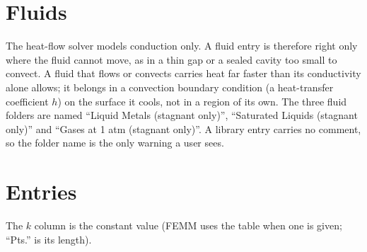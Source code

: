 \documentclass[10pt]{article}
\begin{document}
\section*{Fluids}

The heat-flow solver models conduction only. A fluid entry is therefore right only where the fluid cannot move, as in a thin gap or a sealed cavity too small to convect. A fluid that flows or convects carries heat far faster than its conductivity alone allows; it belongs in a convection boundary condition (a heat-transfer coefficient $h$) on the surface it cools, not in a region of its own. The three fluid folders are named ``Liquid Metals (stagnant only)'', ``Saturated Liquids (stagnant only)'' and ``Gases at 1 atm (stagnant only)''. A library entry carries no comment, so the folder name is the only warning a user sees.

\section*{Entries}

The $k$ column is the constant value (FEMM uses the table when one is given; ``Pts.'' is its length).
\end{document}
